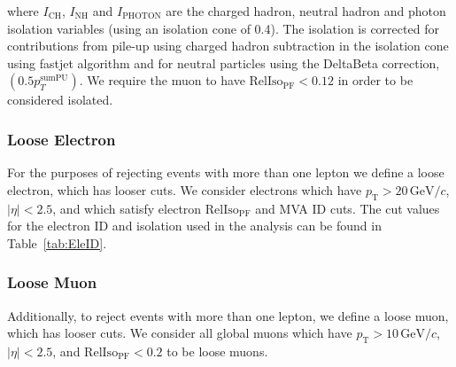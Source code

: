 where $I_{\mathrm{CH}}$, $I_{\mathrm{NH}}$ and $I_{\mathrm{PHOTON}}$
are the charged hadron, neutral hadron and photon isolation variables
(using an isolation cone of 0.4). The isolation is corrected for
contributions from pile-up using charged hadron subtraction in the
isolation cone using fastjet algorithm \cite{FastJetPUSubtraction} and
for neutral particles using the DeltaBeta correction, $(0.5 p_T^\mathrm{sumPU})$. We require the muon to have $\mathrm{RelIso_{\mathrm{PF}}} < 0.12$ in order to be considered isolated.




\subsubsection{Loose Electron}
For the purposes of rejecting events with more than one lepton we
define a loose electron, which has looser cuts. We consider electrons
which have $p_{\mathrm{T}} > 20\,\mathrm{GeV}/c$, $|\eta| < 2.5$,
and which satisfy electron $\mathrm{RelIso_{\mathrm{PF}}}$ and MVA ID
cuts. The cut values for the electron ID and isolation used in the
analysis can be found in Table~\ref{tab:EleID}.

\subsubsection{Loose Muon}
Additionally, to reject events with more than one lepton, we define a
loose muon, which has looser cuts. We consider all global muons which
have $p_{\mathrm{T}} > 10\,\mathrm{GeV}/c$, $|\eta| < 2.5$, and
$\mathrm{RelIso_{\mathrm{PF}}} < 0.2$ to be loose muons.

